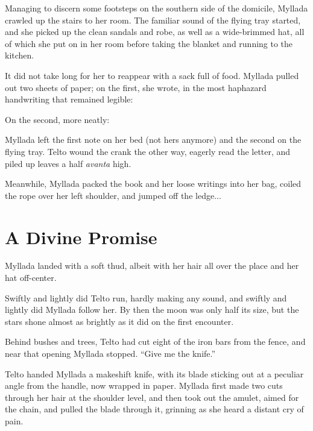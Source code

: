 Managing to discern some footsteps on the southern side of the domicile, Myllada crawled up the stairs to her room. The familiar sound of the flying tray started, and she picked up the clean sandals and robe, as well as a wide-brimmed hat, all of which she put on in her room before taking the blanket and running to the kitchen.

It did not take long for her to reappear with a sack full of food. Myllada pulled out two sheets of paper; on the first, she wrote, in the most haphazard handwriting that remained legible:


On the second, more neatly:


Myllada left the first note on her bed (not hers anymore) and the second on the flying tray. Telto wound the crank the other way, eagerly read the letter, and piled up leaves a half \emph{avanta} high.

Meanwhile, Myllada packed the book and her loose writings into her bag, coiled the rope over her left shoulder, and jumped off the ledge...

\chapter{A Divine Promise}

Myllada landed with a soft thud, albeit with her hair all over the place and her hat off-center.

Swiftly and lightly did Telto run, hardly making any sound, and swiftly and lightly did Myllada follow her. By then the moon was only half its size, but the stars shone almost as brightly as it did on the first encounter.

Behind bushes and trees, Telto had cut eight of the iron bars from the fence, and near that opening Myllada stopped. ``Give me the knife.''

Telto handed Myllada a makeshift knife, with its blade sticking out at a peculiar angle from the handle, now wrapped in paper. Myllada first made two cuts through her hair at the shoulder level, and then took out the amulet, aimed for the chain, and pulled the blade through it, grinning as she heard a distant cry of pain.

